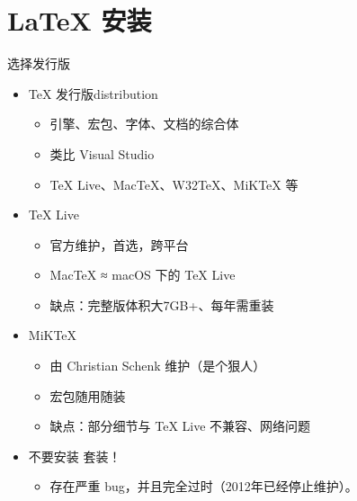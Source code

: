 \section{\LaTeX{} 安装}

\begin{frame}{选择发行版}
    \begin{itemize}
    \item \TeX{} 发行版distribution

        \begin{itemize}
        \item 引擎、宏包、字体、文档的综合体
        \item 类比 Visual Studio
        \item \TeX{} Live、Mac\TeX{}、W32\TeX{}、MiK\TeX{} 等
        \end{itemize} \pause

    \item \TeX{} Live 

        \begin{itemize}
        \item 官方维护，首选，跨平台
        \item Mac\TeX{} ≈ macOS 下的 \TeX{} Live
        \item 缺点：完整版体积大7GB+、每年需重装
        \end{itemize}

    \item MiK\TeX{} 

        \begin{itemize}
        \item 由 Christian Schenk 维护（是个狠人）
        \item 宏包随用随装
        \item 缺点：部分细节与 \TeX{} Live 不兼容、网络问题
        \end{itemize} \pause

    \item \alert{不要安装 \CTeX{} 套装！}

        \begin{itemize}
        \item \alert{存在严重 bug，并且完全过时（2012年已经停止维护）。}
        \end{itemize}
    \end{itemize}
\end{frame}


